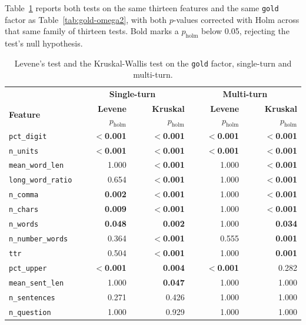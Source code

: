 Table~\ref{tab:levene-kruskal} reports both tests on the same thirteen features and the same \texttt{gold} factor as Table~\ref{tab:gold-omega2}, with both $p$-values corrected with Holm across that same family of thirteen tests. Bold marks a $p_{\text{holm}}$ below 0.05, rejecting the test's null hypothesis.

\begin{table}[htbp]
    \centering
    \small
    \begin{tabular}{@{}lrrrr@{}}
        \toprule
        & \multicolumn{2}{c}{\textbf{Single-turn}} & \multicolumn{2}{c}{\textbf{Multi-turn}} \\
        \textbf{Feature} & \textbf{Levene} $p_{\text{holm}}$ & \textbf{Kruskal} $p_{\text{holm}}$ & \textbf{Levene} $p_{\text{holm}}$ & \textbf{Kruskal} $p_{\text{holm}}$ \\
        \midrule
        \texttt{pct\_digit}        & \textbf{$<$0.001} & \textbf{$<$0.001} & \textbf{$<$0.001} & \textbf{$<$0.001} \\
        \texttt{n\_units}          & \textbf{$<$0.001} & \textbf{$<$0.001} & \textbf{$<$0.001} & \textbf{$<$0.001} \\
        \texttt{mean\_word\_len}   & 1.000          & \textbf{$<$0.001} & 1.000          & \textbf{$<$0.001} \\
        \texttt{long\_word\_ratio} & 0.654          & \textbf{$<$0.001} & 1.000          & \textbf{$<$0.001} \\
        \texttt{n\_comma}          & \textbf{0.002} & \textbf{$<$0.001} & 1.000          & \textbf{$<$0.001} \\
        \texttt{n\_chars}          & \textbf{0.009} & \textbf{$<$0.001} & 1.000          & \textbf{$<$0.001} \\
        \texttt{n\_words}          & \textbf{0.048} & \textbf{0.002} & 1.000          & \textbf{0.034} \\
        \texttt{n\_number\_words}  & 0.364          & \textbf{$<$0.001} & 0.555          & \textbf{0.001} \\
        \texttt{ttr}               & 0.504          & \textbf{$<$0.001} & 1.000          & \textbf{0.001} \\
        \texttt{pct\_upper}        & \textbf{$<$0.001} & \textbf{0.004} & \textbf{$<$0.001} & 0.282          \\
        \texttt{mean\_sent\_len}   & 1.000          & \textbf{0.047} & 1.000          & 1.000          \\
        \texttt{n\_sentences}      & 0.271          & 0.426          & 1.000          & 1.000          \\
        \texttt{n\_question}       & 1.000          & 0.929          & 1.000          & 1.000          \\
        \bottomrule
    \end{tabular}
    \caption[Levene and Kruskal-Wallis tests on \texttt{gold}, single-turn and multi-turn]{Levene's test and the Kruskal-Wallis test on the \texttt{gold} factor, single-turn and multi-turn.}
    \label{tab:levene-kruskal}
\end{table}

